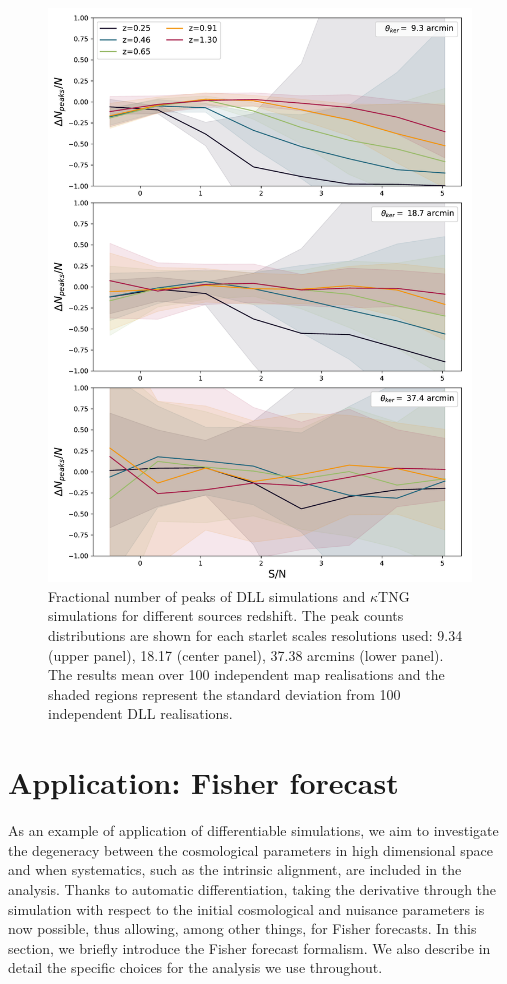 \documentclass[twocolumn,twocolappendix]{aastex63}
\begin{document}
\begin{figure}\label{peaks_z}
    \centering
    \includegraphics[width=\columnwidth]{paper/figures/res_peak_DLL_vs_ktng.pdf}
    \caption{Fractional number of peaks of DLL simulations and $\kappa$TNG simulations for different sources redshift. The peak counts distributions are shown for each starlet scales resolutions used: 9.34 (upper panel), 18.17 (center panel), 37.38 arcmins (lower panel).
  The results mean over 100 independent map realisations and the shaded regions represent the standard deviation from 100 independent DLL realisations.}
\end{figure}


\section{Application: Fisher forecast
}\label{Application_Fisher_forecast_for_HOS}
As an example of application of differentiable simulations, we aim to investigate the degeneracy between the cosmological parameters in high dimensional space and when systematics, such as the intrinsic alignment, are included in the analysis. Thanks to automatic differentiation, 
taking the derivative through the simulation with respect to the initial cosmological and nuisance parameters is now possible, thus allowing, among other things, for Fisher forecasts.
In this section, we briefly introduce the Fisher forecast formalism. We also describe in detail the specific choices for the analysis we use throughout.
\end{document}
